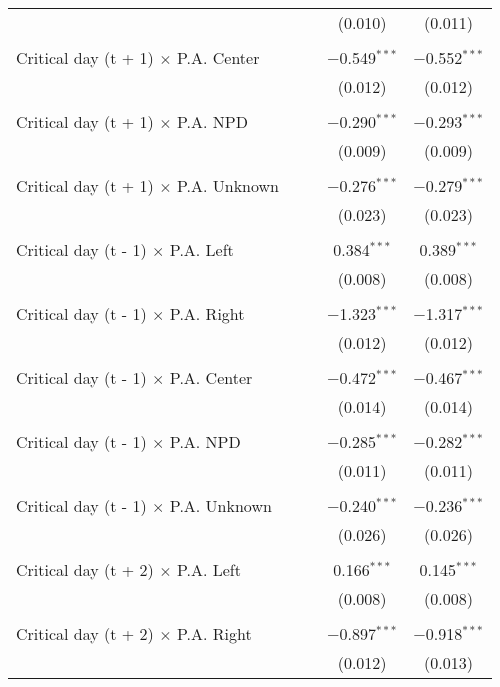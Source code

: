 \documentclass[
]{article}
\begin{document}
\begin{table}[!htbp]
{\begin{tabular}{@{\extracolsep{5pt}}lcccc}
  &  &  & (0.010) & (0.011) \\ 
  & & & & \\ 
 Critical day (t + 1) $\times$ P.A. Center &  &  & $-$0.549$^{***}$ & $-$0.552$^{***}$ \\ 
  &  &  & (0.012) & (0.012) \\ 
  & & & & \\ 
 Critical day (t + 1) $\times$ P.A. NPD &  &  & $-$0.290$^{***}$ & $-$0.293$^{***}$ \\ 
  &  &  & (0.009) & (0.009) \\ 
  & & & & \\ 
 Critical day (t + 1) $\times$ P.A. Unknown &  &  & $-$0.276$^{***}$ & $-$0.279$^{***}$ \\ 
  &  &  & (0.023) & (0.023) \\ 
  & & & & \\ 
 Critical day (t - 1) $\times$ P.A. Left &  &  & 0.384$^{***}$ & 0.389$^{***}$ \\ 
  &  &  & (0.008) & (0.008) \\ 
  & & & & \\ 
 Critical day (t - 1) $\times$ P.A. Right &  &  & $-$1.323$^{***}$ & $-$1.317$^{***}$ \\ 
  &  &  & (0.012) & (0.012) \\ 
  & & & & \\ 
 Critical day (t - 1) $\times$ P.A. Center &  &  & $-$0.472$^{***}$ & $-$0.467$^{***}$ \\ 
  &  &  & (0.014) & (0.014) \\ 
  & & & & \\ 
 Critical day (t - 1) $\times$ P.A. NPD &  &  & $-$0.285$^{***}$ & $-$0.282$^{***}$ \\ 
  &  &  & (0.011) & (0.011) \\ 
  & & & & \\ 
 Critical day (t - 1) $\times$ P.A. Unknown &  &  & $-$0.240$^{***}$ & $-$0.236$^{***}$ \\ 
  &  &  & (0.026) & (0.026) \\ 
  & & & & \\ 
 Critical day (t + 2) $\times$ P.A. Left &  &  & 0.166$^{***}$ & 0.145$^{***}$ \\ 
  &  &  & (0.008) & (0.008) \\ 
  & & & & \\ 
 Critical day (t + 2) $\times$ P.A. Right &  &  & $-$0.897$^{***}$ & $-$0.918$^{***}$ \\ 
  &  &  & (0.012) & (0.013) \\ 

\end{tabular}}
\end{table}
\end{document}
